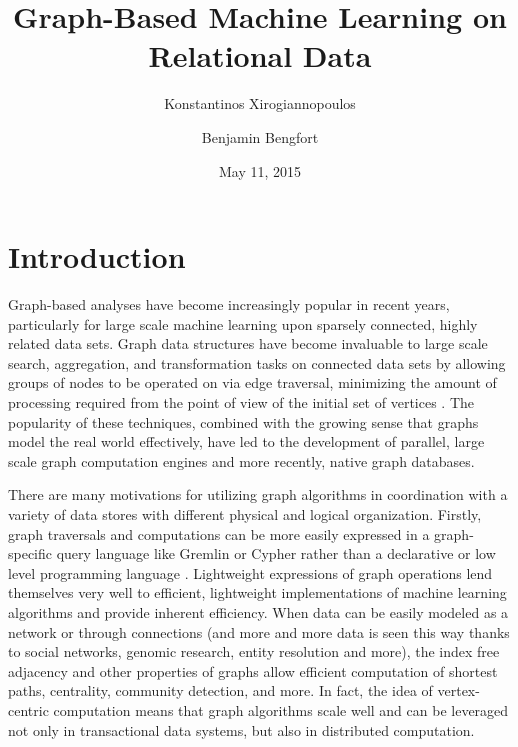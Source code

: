 \documentclass[11pt,letterpaper]{article}
\begin{document}
\title{Graph-Based Machine Learning on Relational Data}

\author[ ]{Konstantinos Xirogiannopoulos}
\author[ ]{Benjamin Bengfort}

\date{May 11, 2015}

\maketitle


\section*{Introduction}

Graph-based analyses have become increasingly popular in recent years, particularly for large scale machine learning upon sparsely connected, highly related data sets. Graph data structures have become invaluable to large scale search, aggregation, and transformation tasks on connected data sets by allowing groups of nodes to be operated on via edge traversal, minimizing the amount of processing required from the point of view of the initial set of vertices \cite{berretti_efficient_2001}. The popularity of these techniques, combined with the growing sense that graphs model the real world effectively, have led to the development of parallel, large scale graph computation  engines and more recently, native graph databases.


There are many motivations for utilizing graph algorithms in coordination with a variety of data stores with different physical and logical organization. Firstly, graph traversals and computations can be more easily expressed in a graph-specific query language like Gremlin \cite{rodriguez_gremlin_2013} or Cypher \cite{miller_graph_2013} rather than a declarative or low level programming language \cite{rodriguez_exploring_2012}. Lightweight expressions of graph operations lend themselves very well to efficient, lightweight implementations of machine learning algorithms and provide inherent efficiency. When data can be easily modeled as a network or through connections (and more and more data is seen this way thanks to social networks, genomic research, entity resolution and more), the index free adjacency and other properties of graphs allow efficient computation of shortest paths, centrality, community detection, and more. In fact, the idea of vertex-centric computation \cite{malewicz_pregel:_2010} means that graph algorithms scale well and can be leveraged not only in transactional data systems, but also in distributed computation.
\end{document}
